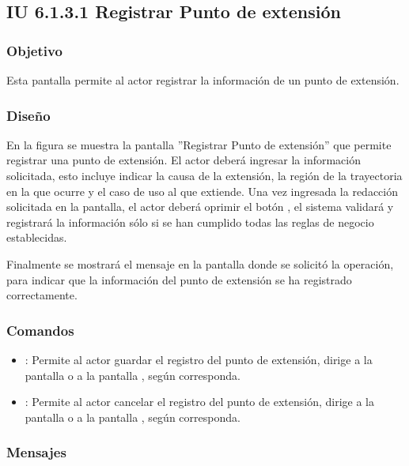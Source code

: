 \subsection{IU 6.1.3.1 Registrar Punto de extensión}

\subsubsection{Objetivo}
	Esta pantalla permite al actor registrar la información de un punto de extensión.
\subsubsection{Diseño}
	En la figura  se muestra la pantalla ''Registrar Punto de extensión'' que permite registrar una punto de extensión. El actor deberá ingresar la información solicitada, esto incluye indicar la causa de la extensión, la región de la trayectoria en la que ocurre y el caso de uso al que extiende.
	Una vez ingresada la redacción solicitada en la pantalla, el actor deberá oprimir el botón , el sistema validará y registrará la información sólo si se han cumplido todas las reglas de negocio establecidas.
	
	Finalmente se mostrará el mensaje  en la pantalla donde se solicitó la operación, para indicar que la información del punto de extensión se ha registrado correctamente.

\subsubsection{Comandos}
\begin{itemize}
	\item {}: Permite al actor guardar el registro del punto de extensión, dirige a la pantalla  o a la pantalla , según corresponda.
	\item {}: Permite al actor cancelar el registro del punto de extensión, dirige a la pantalla  o a la pantalla , según corresponda.
\end{itemize}

\subsubsection{Mensajes}

